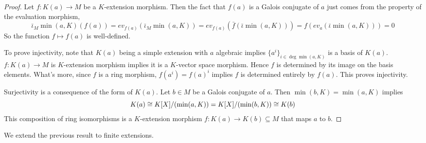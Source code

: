 \documentclass[../book.tex]{subfiles}
\begin{document}
\begin{proof}
    Let $f : K(a) \to M$ be a $K$-extension morphism. 
    Then the fact that $f(a)$ is a Galois conjugate of $a$ just comes from
    the property of the evaluation morphism, 
    \[
        \bar\iota_M \min(a,K) (f(a)) = ev_{f(a)}(\bar\iota_M \min(a,K))
        = ev_{f(a)} (\bar{f}(\bar\iota \min(a,K))) 
        = f(ev_a (\bar\iota \min(a,K))) = 0
    \]
    So the function $f \mapsto f(a)$ is well-defined. 
    
    To prove injectivity, note that $K(a)$ being a simple extension with
    $a$ algebraic implies $\{a^i\}_{i\in\deg\min(a,K)}$ is a basis of $K(a)$. 
    $f : K(a) \to M$ is $K$-extension morphism implies 
    it is a $K$-vector space morphism. 
    Hence $f$ is determined by its image on the basis elements. 
    What's more, since $f$ is a ring morphism, 
    $f(a^i) = f(a)^i$ implies $f$ is determined entirely by $f(a)$. 
    This proves injectivity. 
    
    Surjectivity is a consequence of the form of $K(a)$.
    Let $b \in M$ be a Galois conjugate of $a$. 
    Then $\min(b,K) = \min(a,K)$ implies \[
        K(a) \cong K[X]/(\min(a,K)) = K[X]/(\min(b,K)) \cong K(b)
    \]
    This composition of ring isomorphisms is a $K$-extension morphism 
    $f : K(a) \to K(b) \subseteq M$ that maps $a$ to $b$. 
\end{proof}

We extend the previous result to finite extensions. 
\end{document}
